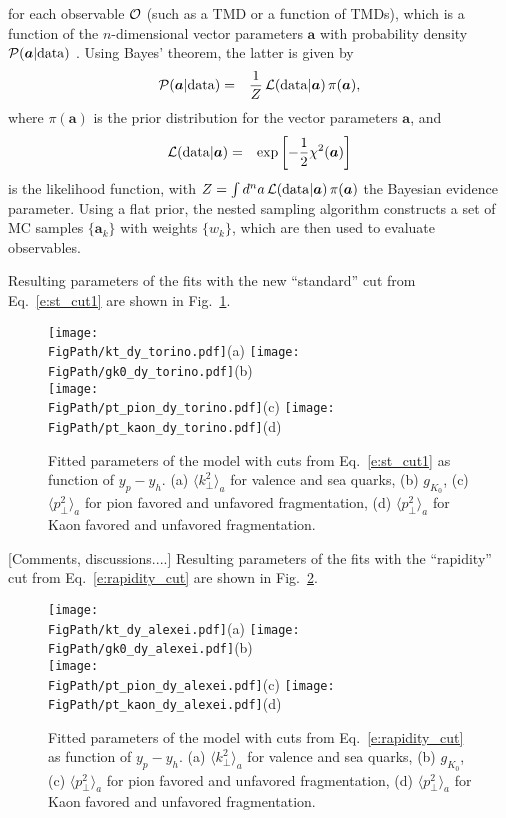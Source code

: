\documentclass[final,3p,times,onecolumn,sort&compress,hidelinks]{elsarticle}
\newcommand\3[1]{\boldsymbol{#1}}
\newcommand*{\FigPath}{../Figs/}%
\begin{document}
%
for each observable ${\cal O}$ (such as a TMD or a function of TMDs),
which is a function of the $n$-dimensional vector parameters ${\bm a}$
with probability density ${\cal P}({\bm a}|{\rm data})$
\cite{Sato:2016wqj}.
Using Bayes' theorem, the latter is given by
%
\begin{eqnarray}
{\cal P}({\bm a}|{\rm data})
&=& \frac{1}{Z}\, {\cal L}({\rm data}|{\bm a})\, \pi({\bm a}),
\end{eqnarray}
%
where $\pi({\bm a})$ is the prior distribution for the vector
parameters ${\bm a}$, and
%
\begin{eqnarray}
{\cal L}({\rm data}|{\bm a})
&=& \exp\left[ -\frac12 \chi^2({\bm a}) \right]
\end{eqnarray}
%
is the likelihood function, with
  $Z = \int d^n a\, {\cal L}({\rm data}|{\bm a})\, \pi({\bm a})$
the Bayesian evidence parameter.
%
Using a flat prior, the nested sampling algorithm constructs a set
of MC samples $\{\bm a_k\}$ with weights $\{w_k\}$, which are then
used to evaluate observables.



Resulting parameters of the fits with  the  new ``standard'' cut from Eq.~\eqref{e:st_cut1} 
are shown in Fig.~\ref{Fig:torino}.

\begin{figure}[htb!]
\centering
\texttt{[image: \\FigPath/kt\_dy\_torino.pdf]}{\tiny(a)}%
\texttt{[image: \\FigPath/gk0\_dy\_torino.pdf]}{\tiny(b)}\\%
\texttt{[image: \\FigPath/pt\_pion\_dy\_torino.pdf]}{\tiny(c)}%
\texttt{[image: \\FigPath/pt\_kaon\_dy\_torino.pdf]}{\tiny(d)}%
\caption{\label{Fig:torino}
Fitted parameters of the model with cuts from Eq.~\eqref{e:st_cut1} as function of $y_p-y_h$. (a) $\langle k_\perp^2 \rangle_a$ for valence and sea quarks,
(b) $g_{K_0}$,
(c) $\langle p_\perp^2 \rangle_a$ for pion favored and unfavored fragmentation, (d) $\langle p_\perp^2 \rangle_a$ for Kaon favored and unfavored fragmentation.
}
\end{figure}

[Comments, discussions....]
\newpage
Resulting parameters of the fits with  the ``rapidity'' cut from Eq.~\eqref{e:rapidity_cut} 
are shown in Fig.~\ref{Fig:rapidity_cut}.
\begin{figure}[htb!]
\centering
\texttt{[image: \\FigPath/kt\_dy\_alexei.pdf]}{\tiny(a)}%
\texttt{[image: \\FigPath/gk0\_dy\_alexei.pdf]}{\tiny(b)}\\%
\texttt{[image: \\FigPath/pt\_pion\_dy\_alexei.pdf]}{\tiny(c)}%
\texttt{[image: \\FigPath/pt\_kaon\_dy\_alexei.pdf]}{\tiny(d)}%
\caption{\label{Fig:rapidity_cut}
Fitted parameters of the model with cuts from Eq.~\eqref{e:rapidity_cut} as function of $y_p-y_h$. (a) $\langle k_\perp^2 \rangle_a$ for valence and sea quarks,
(b) $g_{K_0}$,
(c) $\langle p_\perp^2 \rangle_a$ for pion favored and unfavored fragmentation, (d) $\langle p_\perp^2 \rangle_a$ for Kaon favored and unfavored fragmentation.
}
\end{figure}
\end{document}
